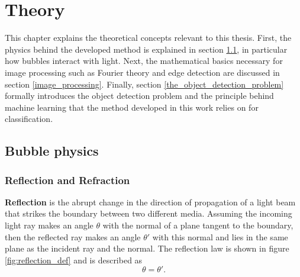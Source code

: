 \chapter{Theory}\label{theory}
This chapter explains the theoretical concepts relevant to this thesis. First, the physics behind the developed method is explained in section \ref{bubble_physics}, in particular how bubbles interact with light.
Next, the mathematical basics necessary for image processing such as Fourier theory and edge detection are discussed in section \ref{image_processing}. Finally, section \ref{the_object_detection_problem} formally introduces the object detection problem and the principle behind machine learning that the method developed in this work relies on for classification.

	\section{Bubble physics} \label{bubble_physics}

		\subsection{Reflection and Refraction}
			\textbf{Reflection} is the abrupt change in the direction of propagation of a light beam that strikes the boundary between two different media. Assuming the incoming light ray makes an angle $\theta$ with the normal of a plane tangent to the boundary, then the reflected ray makes an angle $\theta'$ with this normal and lies in the same plane as the incident ray and the normal. The reflection law is shown in figure \ref{fig:reflection_def} and is described as
			\begin{equation}
				\theta = \theta'.
			\end{equation}
			
